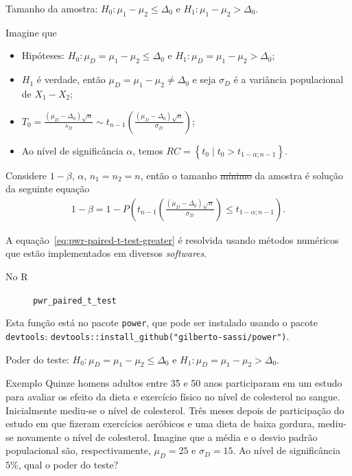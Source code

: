 \documentclass[9pt]{beamer}
\begin{document}
\begin{frame}{Tamanho da amostra: $H_0:\mu_1 - \mu_2 \leq \Delta_0$ e $H_1: \mu_1 - \mu_2 > \Delta_0$.}

\normalsize
Imagine que
\begin{itemize}
	\item Hipóteses: $H_0:\mu_D= \mu_1 - \mu_2 \leq \Delta_0$ e $H_1:\mu_D= \mu_1 -  \mu_2 > \Delta_0$;
	\item $H_1$ é verdade, então $\mu_D = \mu_1-\mu_2 \neq \Delta_0$ e seja $\sigma_D$ é a variância populacional de $X_1 - X_2$;
	\item $T_0 = \frac{(\mu_D - \Delta_0)\sqrt{n}}{s_D} \sim t_{n-1}\left( \frac{(\mu_D - \Delta_0)\sqrt{n}}{\sigma_D} \right)$;
	\item Ao nível de significância $\alpha$, temos $RC = \left\{ t_0 \mid t_0 > t_{1  -\alpha;n-1}  \right\}$.
\end{itemize}
\vfill

Considere $1-\beta$, $\alpha$, $n_1=n_2=n$, então o tamanho \sout{mínimo} da amostra é solução da seguinte equação
\scriptsize
\begin{align}\label{eq:pwr-paired-t-test-greater}
1-\beta = 1 - P\left( t_{n-1}\left( \frac{(\mu_D - \Delta_0)\sqrt{n}}{\sigma_D} \right) \leq t_{1-\alpha;n-1} \right).
\end{align}

A equação~\eqref{eq:pwr-paired-t-test-greater} é resolvida usando métodos numéricos que estão implementados em diversos \textit{softwares}.
\begin{description}
	\item[No R] \lstinline|pwr_paired_t_test|
\end{description}
Esta função está no pacote \lstinline|power|, que pode ser instalado usando o pacote \lstinline|devtools|: \lstinline|devtools::install_github("gilberto-sassi/power")|.

\normalsize
\end{frame}

\begin{frame}{Poder do teste: $H_0:\mu_D = \mu_1 - \mu_2 \leq \Delta_0$ e $H_1:\mu_D =  \mu_1 - \mu_2 > \Delta_0$.}

\large
\begin{block}{Exemplo}
	Quinze homens adultos entre 35 e 50 anos participaram em um estudo para avaliar os efeito da dieta e exercício físico no nível de colesterol no sangue. Inicialmente mediu-se o nível de colesterol. Três meses depois de participação do estudo em que fizeram exercícios aeróbicos e uma dieta de baixa gordura,  mediu-se novamente o nível de colesterol. Imagine que a média e o desvio padrão populacional são, respectivamente, $\mu_D = 25$ e $\sigma_D = 15$.  Ao nível de significância $5\%$, qual o poder do teste?
\end{block}
\normalsize

\end{frame}
\end{document}
